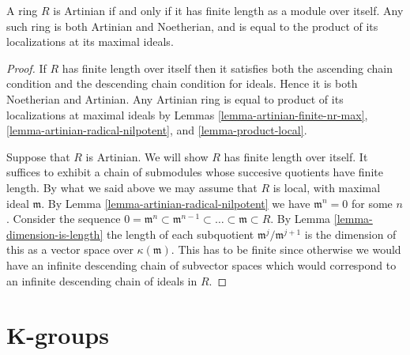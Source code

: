 \begin{lemma}
\label{lemma-artinian-finite-length}
A ring $R$ is Artinian if and only if it has finite length
as a module over itself. Any such ring is both Artinian and
Noetherian, and is equal to the product of its localizations
at its maximal ideals.
\end{lemma}

\begin{proof}
If $R$ has finite length over itself then it satisfies both
the ascending chain condition and the descending chain
condition for ideals. Hence it is both Noetherian and Artinian.
Any Artinian ring is equal to product of its localizations
at maximal ideals by Lemmas \ref{lemma-artinian-finite-nr-max},
\ref{lemma-artinian-radical-nilpotent}, and \ref{lemma-product-local}.

\medskip\noindent
Suppose that $R$ is Artinian. We will show $R$ has finite
length over itself. It suffices to exhibit a chain of
submodules whose succesive quotients have finite length.
By what we said above
we may assume that $R$ is local, with maximal ideal $\mathfrak m$.
By Lemma \ref{lemma-artinian-radical-nilpotent} we have
$\mathfrak m^n =0$ for some $n$.
Consider the sequence
$0 = \mathfrak m^n \subset \mathfrak m^{n-1} \subset
\ldots \subset \mathfrak m \subset R$. By Lemma
\ref{lemma-dimension-is-length} the length of each subquotient
$\mathfrak m^j/\mathfrak m^{j + 1}$ is the dimension of this
as a vector space over $\kappa(\mathfrak m)$. This has to be
finite since otherwise we would have an infinite descending
chain of subvector spaces which would correspond to an
infinite descending chain of ideals in $R$.
\end{proof}






































\section{K-groups}
\label{section-K-groups}

